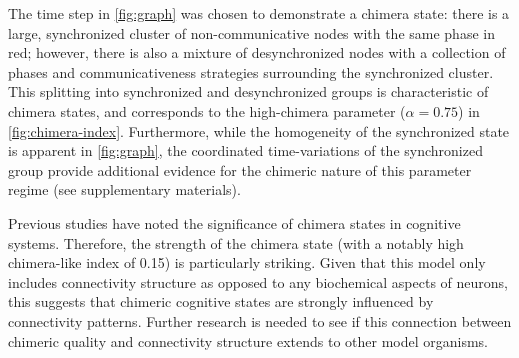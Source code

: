 \documentclass[pdflatex,lineno,referee,sn-mathphys-ay]{sn-jnl}
\begin{document}
The time step in \cref{fig:graph} was chosen
to demonstrate a chimera state:
there is a large, synchronized cluster
of non-communicative nodes with the same phase in red;
however, there is also a mixture of desynchronized nodes
with a collection of phases and communicativeness strategies
surrounding the synchronized cluster.
This splitting into synchronized and desynchronized groups
is characteristic of chimera states,
and corresponds to the high-chimera parameter ($\alpha = 0.75$)
in \cref{fig:chimera-index}.
Furthermore, while the homogeneity of the synchronized state is apparent
in \cref{fig:graph},
the coordinated time-variations of the synchronized group
provide additional evidence for the chimeric nature
of this parameter regime (see supplementary materials).

Previous studies \citep[\eg][]{bansal2019cognitive,santos2017chimera}
have noted the significance of chimera states in cognitive systems.
Therefore, the strength of the chimera state
(with a notably high chimera-like index of \num{0.15}) is particularly striking.
Given that this model only includes connectivity structure
as opposed to any biochemical aspects of neurons,
this suggests that chimeric cognitive states are strongly influenced
by connectivity patterns.
Further research is needed to see if this connection between chimeric quality
and connectivity structure extends to other model organisms.
\end{document}
